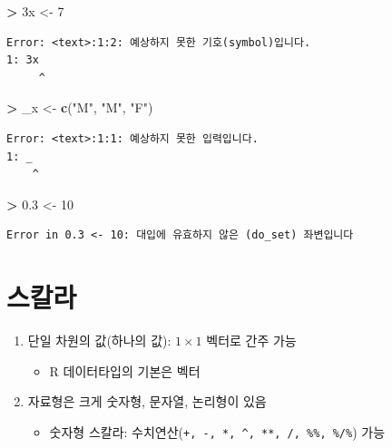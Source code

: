 \documentclass[12pt,a4paper]{book}
\newenvironment{Shaded}{\begin{snugshade}}{\end{snugshade}}
\newcommand{\KeywordTok}[1]{\textcolor[rgb]{0.13,0.29,0.53}{\textbf{#1}}}
\newcommand{\DecValTok}[1]{\textcolor[rgb]{0.00,0.00,0.81}{#1}}
\newcommand{\FloatTok}[1]{\textcolor[rgb]{0.00,0.00,0.81}{#1}}
\newcommand{\StringTok}[1]{\textcolor[rgb]{0.31,0.60,0.02}{#1}}
\newcommand{\OperatorTok}[1]{\textcolor[rgb]{0.81,0.36,0.00}{\textbf{#1}}}
\newcommand{\NormalTok}[1]{#1}
\providecommand{\tightlist}{%
  \setlength{\itemsep}{0pt}\setlength{\parskip}{0pt}}
\theoremstyle{definition}
\theoremstyle{definition}
\theoremstyle{definition}
\theoremstyle{remark}
\begin{document}
\begin{Shaded}
\begin{Highlighting}[]
\OperatorTok{>}\StringTok{ }\NormalTok{3x <-}\StringTok{ }\DecValTok{7}
\end{Highlighting}
\end{Shaded}

\begin{verbatim}
Error: <text>:1:2: 예상하지 못한 기호(symbol)입니다.
1: 3x
     ^
\end{verbatim}

\begin{Shaded}
\begin{Highlighting}[]
\OperatorTok{>}\StringTok{ }\NormalTok{_x <-}\StringTok{ }\KeywordTok{c}\NormalTok{(}\StringTok{"M"}\NormalTok{, }\StringTok{"M"}\NormalTok{, }\StringTok{"F"}\NormalTok{)}
\end{Highlighting}
\end{Shaded}

\begin{verbatim}
Error: <text>:1:1: 예상하지 못한 입력입니다.
1: _
    ^
\end{verbatim}

\begin{Shaded}
\begin{Highlighting}[]
\OperatorTok{>}\StringTok{ }\FloatTok{0.3}\NormalTok{ <-}\StringTok{ }\DecValTok{10}
\end{Highlighting}
\end{Shaded}

\begin{verbatim}
Error in 0.3 <- 10: 대입에 유효하지 않은 (do_set) 좌변입니다
\end{verbatim}

\section{스칼라}

\begin{enumerate}
\def\labelenumi{\arabic{enumi}.}
\tightlist
\item
  단일 차원의 값(하나의 값): \(1 \times 1\) 벡터로 간주 가능

  \begin{itemize}
  \tightlist
  \item
    R 데이터타입의 기본은 벡터
  \end{itemize}
\item
  자료형은 크게 숫자형, 문자열, 논리형이 있음

  \begin{itemize}
  \tightlist
  \item
    숫자형 스칼라:
    수치연산(\texttt{+,\ -,\ *,\ \^{},\ **,\ /,\ \%\%,\ \%/\%}) 가능
  \end{itemize}
\end{enumerate}
\end{document}
